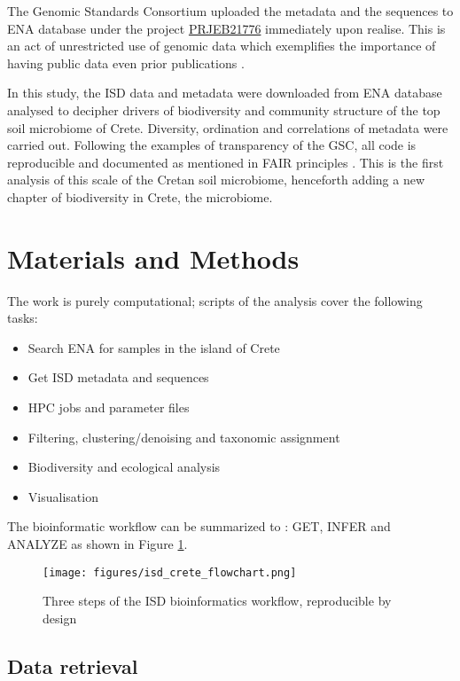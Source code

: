 The Genomic Standards Consortium uploaded the metadata and the sequences to ENA
database under the project \href{https://www.ebi.ac.uk/ena/browser/view/PRJEB21776}{PRJEB21776} immediately upon realise. 
This is an act of unrestricted use of genomic data which exemplifies the importance of 
having public data even prior publications \parencite{kopf_2015}.

In this study, the ISD data and metadata were downloaded from ENA database analysed to decipher drivers of 
biodiversity and community structure of the top soil microbiome of Crete. Diversity, 
ordination and correlations of metadata were carried out. Following the examples of 
transparency of the GSC, all code is reproducible and documented as mentioned in FAIR principles \parencite{wilkinson2016the-fair}.
This is the first analysis 
of this scale of the Cretan soil microbiome, henceforth adding a new chapter of 
biodiversity in Crete, the microbiome.

\section{Materials and Methods}\label{isd_methods}

The work is purely computational; scripts of the analysis cover the following tasks:
\begin{itemize}
    \item Search ENA for samples in the island of Crete
    \item Get ISD metadata and sequences
    \item HPC jobs and parameter files
    \item Filtering, clustering/denoising and taxonomic assignment
    \item Biodiversity and ecological analysis 
    \item Visualisation
\end{itemize}

The bioinformatic workflow can be summarized to : GET, INFER and ANALYZE as shown in Figure \ref{fig:isd_workflow_taxonomy}.

\begin{figure}[h]
      \centering
      \texttt{[image: figures/isd\_crete\_flowchart.png]}
      \caption[Reproducible workflow of ISD analysis]{Three steps of the ISD bioinformatics workflow, reproducible by design}
      \label{fig:isd_workflow_taxonomy}
   \end{figure}
   
\subsection{Data retrieval}\label{isd_get}

